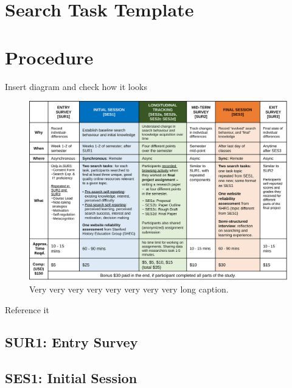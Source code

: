 \documentclass[letterpaper, nobind]{templates/ociamthesis}
\begin{document}
\hypertarget{sec_method_search_task_template}{%
\section{Search Task Template}\label{sec_method_search_task_template}}

\hypertarget{sec_method_procedure}{%
\section{Procedure}\label{sec_method_procedure}}

Insert diagram and check how it looks



\begin{figure}

{\centering \includegraphics[width=1\linewidth]{figs/fig-study-proc-diss} 

}

\caption[Short Caption for LoF]{Very very very very very very very very long caption.}\label{fig:fig-study-proc-diss}
\end{figure}

Reference it

\hypertarget{sec-method-sur1}{%
\subsection{SUR1: Entry Survey}\label{sec-method-sur1}}

\hypertarget{ses1-initial-session}{%
\subsection{SES1: Initial Session}\label{ses1-initial-session}}
\end{document}
